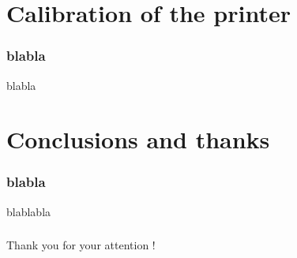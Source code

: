 \documentclass{beamer}
\begin{document}
\section{Calibration of the printer}
\begin{frame}
	\frametitle{blabla}

    \begin{block}{blabla}
    \end{block}
\end{frame}

\section{Conclusions and thanks}
\begin{frame}
	\frametitle{blabla}

    \begin{block}{blablabla}
    \end{block}
\end{frame}

\begin{frame}
	\frametitle{}

    \begin{center}
    \Large{Thank you for your attention !}
    \end{center}
\end{frame}
	
\end{document}
